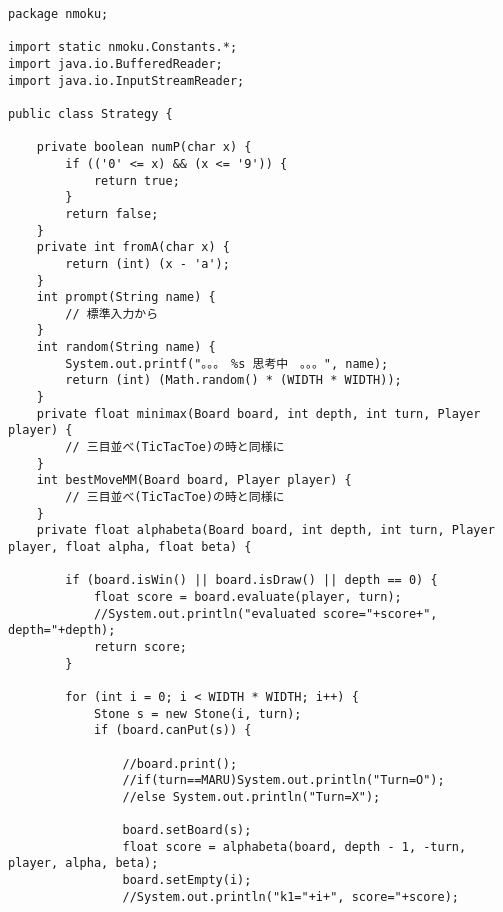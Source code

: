\documentclass[uplatex,a4paper,11pt,oneside,openany]{jsbook}
\begin{document}
\begin{lstlisting}[caption=戦略クラス：N目並べ,label=prog31]
package nmoku;

import static nmoku.Constants.*;
import java.io.BufferedReader;
import java.io.InputStreamReader;

public class Strategy {

    private boolean numP(char x) {
        if (('0' <= x) && (x <= '9')) {
            return true;
        }
        return false;
    }
    private int fromA(char x) {
        return (int) (x - 'a');
    }
    int prompt(String name) {
        // 標準入力から
    }
    int random(String name) {
        System.out.printf("。。。　%s 思考中　。。。", name);
        return (int) (Math.random() * (WIDTH * WIDTH));
    }
    private float minimax(Board board, int depth, int turn, Player player) {
        // 三目並べ(TicTacToe)の時と同様に
    }
    int bestMoveMM(Board board, Player player) {
        // 三目並べ(TicTacToe)の時と同様に
    }
    private float alphabeta(Board board, int depth, int turn, Player player, float alpha, float beta) {

        if (board.isWin() || board.isDraw() || depth == 0) {
            float score = board.evaluate(player, turn);
            //System.out.println("evaluated score="+score+", depth="+depth);
            return score;
        }

        for (int i = 0; i < WIDTH * WIDTH; i++) {
            Stone s = new Stone(i, turn);
            if (board.canPut(s)) {

                //board.print();
                //if(turn==MARU)System.out.println("Turn=O");
                //else System.out.println("Turn=X");

                board.setBoard(s);
                float score = alphabeta(board, depth - 1, -turn, player, alpha, beta);
                board.setEmpty(i);
                //System.out.println("k1="+i+", score="+score);


\end{lstlisting}
\end{document}
